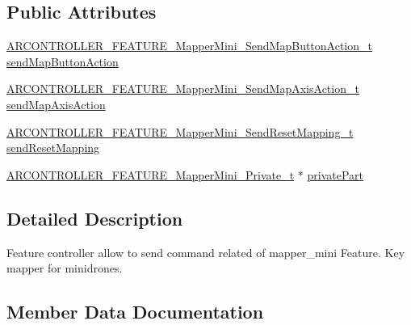 \subsection*{Public Attributes}
\begin{DoxyCompactItemize}
\item 
\hyperlink{_a_r_c_o_n_t_r_o_l_l_e_r___feature_8h_a52c5da0e3db9382ab0df448ef7f06383}{A\+R\+C\+O\+N\+T\+R\+O\+L\+L\+E\+R\+\_\+\+F\+E\+A\+T\+U\+R\+E\+\_\+\+Mapper\+Mini\+\_\+\+Send\+Map\+Button\+Action\+\_\+t} \hyperlink{struct_a_r_c_o_n_t_r_o_l_l_e_r___f_e_a_t_u_r_e___mapper_mini__t_a12242574404227daaae4707c5dc3fa31}{send\+Map\+Button\+Action}
\item 
\hyperlink{_a_r_c_o_n_t_r_o_l_l_e_r___feature_8h_a508f5c849a6764980b5c7ea792c2984a}{A\+R\+C\+O\+N\+T\+R\+O\+L\+L\+E\+R\+\_\+\+F\+E\+A\+T\+U\+R\+E\+\_\+\+Mapper\+Mini\+\_\+\+Send\+Map\+Axis\+Action\+\_\+t} \hyperlink{struct_a_r_c_o_n_t_r_o_l_l_e_r___f_e_a_t_u_r_e___mapper_mini__t_a4cb1fc96c535cee840c125e76823ec5e}{send\+Map\+Axis\+Action}
\item 
\hyperlink{_a_r_c_o_n_t_r_o_l_l_e_r___feature_8h_a17e1a730d8b326a6d3787b5bd648f606}{A\+R\+C\+O\+N\+T\+R\+O\+L\+L\+E\+R\+\_\+\+F\+E\+A\+T\+U\+R\+E\+\_\+\+Mapper\+Mini\+\_\+\+Send\+Reset\+Mapping\+\_\+t} \hyperlink{struct_a_r_c_o_n_t_r_o_l_l_e_r___f_e_a_t_u_r_e___mapper_mini__t_a5116e2ddafe64dc0f5965fd5ce7e0979}{send\+Reset\+Mapping}
\item 
\hyperlink{_a_r_c_o_n_t_r_o_l_l_e_r___feature_8h_ac20cd48c65fbb2beabafe02307397bdf}{A\+R\+C\+O\+N\+T\+R\+O\+L\+L\+E\+R\+\_\+\+F\+E\+A\+T\+U\+R\+E\+\_\+\+Mapper\+Mini\+\_\+\+Private\+\_\+t} $\ast$ \hyperlink{struct_a_r_c_o_n_t_r_o_l_l_e_r___f_e_a_t_u_r_e___mapper_mini__t_a3ae3cf4bb013dcdf703285ea52e72911}{private\+Part}
\end{DoxyCompactItemize}


\subsection{Detailed Description}
Feature controller allow to send command related of mapper\+\_\+mini Feature. Key mapper for minidrones. 

\subsection{Member Data Documentation}
